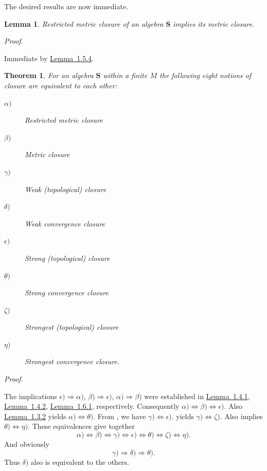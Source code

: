 \documentclass[b5paper,twoside]{article}
\newcommand{\lemref}[2]{\hyperref[#1]{\mbox{Lemma~#2}}}
\theoremstyle{mvnplain}
\newtheorem{theorem}{Theorem}
\newtheorem{lemma}{Lemma}[section]
\renewenvironment{proof}[1][Proof]{%
  \par\addvspace{0.35\baselineskip}%
  \noindent\textit{#1.}\ \normalfont\ignorespaces
}{%
  \par\addvspace{0.35\baselineskip}%
}
\newcommand{\M}{\mathbf M}
\def\M{M}%
\begin{document}
The desired results are now immediate.
\begin{lemma}\label{lem:1.6.1}
Restricted metric closure of an algebra $\mathbf S$ implies its metric closure.
\end{lemma}
\begin{proof}
Immediate by \lemref{lem:1.5.4}{1.5.4}.
\end{proof}

\begin{theorem}\label{thm:I}
For an algebra $\mathbf S$ within a finite $\M$ the following eight notions of
closure are equivalent to each other:
\begin{description}
  \item[$\alpha)$] Restricted metric closure
  \item[$\beta)$] Metric closure
  \item[$\gamma)$] Weak (topological) closure
  \item[$\delta)$] Weak convergence closure
  \item[$\epsilon)$] Strong (topological) closure
  \item[$\theta)$] Strong convergence closure
  \item[$\zeta)$] Strongest (topological) closure
  \item[$\eta)$] Strongest convergence closure.
\end{description}
\end{theorem}
\begin{proof}
The implications $\epsilon)\Rightarrow\alpha)$,
$\beta)\Rightarrow\epsilon)$, $\alpha)\Rightarrow\beta)$ were established in
\lemref{lem:1.4.1}{1.4.1}, \lemref{lem:1.4.2}{1.4.2},
\lemref{lem:1.6.1}{1.6.1}, respectively.  Consequently
$\alpha)\Leftrightarrow\beta)\Leftrightarrow\epsilon)$.  Also
\lemref{lem:1.3.2}{1.3.2} yields $\alpha)\Leftrightarrow\theta)$.  From
\cite[p.~396, end of \S3]{ref2}, we have
$\gamma)\Leftrightarrow\epsilon)$.  \cite[p.~112, beginning of \S3]{ref4}
yields $\gamma)\Leftrightarrow\zeta)$.  Also
\cite[p.~112, end of \S2]{ref4} implies
$\theta)\Leftrightarrow\eta)$.  These equivalences give together
\[
  \alpha)\Leftrightarrow\beta)\Leftrightarrow\gamma)
  \Leftrightarrow\epsilon)\Leftrightarrow\theta)
  \Leftrightarrow\zeta)\Leftrightarrow\eta).
\]
And obviously
\[
  \gamma)\Rightarrow\delta)\Rightarrow\theta).
\]
Thus $\delta)$ also is equivalent to the others.
\end{proof}
\end{document}
